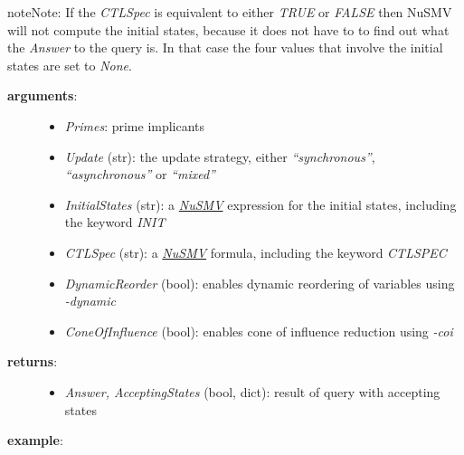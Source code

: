 \documentclass[letterpaper,10pt,english]{sphinxmanual}
\begin{document}
\begin{fulllineitems}
\begin{notice}{note}{Note:}
If the \emph{CTLSpec} is equivalent to either \emph{TRUE} or \emph{FALSE} then NuSMV will not compute the initial states,
because it does not have to to find out what the \emph{Answer} to the query is.
In that case the four values that involve the initial states are set to \emph{None}.
\end{notice}
\begin{description}
\item[{\textbf{arguments}:}] \leavevmode\begin{itemize}
\item {} 
\emph{Primes}: prime implicants

\item {} 
\emph{Update} (str): the update strategy, either \emph{``synchronous''}, \emph{``asynchronous''} or \emph{``mixed''}

\item {} 
\emph{InitialStates} (str): a {\hyperref[Installation:installation-nusmv]{\emph{NuSMV}}} expression for the initial states, including the keyword \emph{INIT}

\item {} 
\emph{CTLSpec} (str): a {\hyperref[Installation:installation-nusmv]{\emph{NuSMV}}} formula, including the keyword \emph{CTLSPEC}

\item {} 
\emph{DynamicReorder} (bool): enables dynamic reordering of variables using \emph{-dynamic}

\item {} 
\emph{ConeOfInfluence} (bool): enables cone of influence reduction using \emph{-coi}

\end{itemize}

\item[{\textbf{returns}:}] \leavevmode\begin{itemize}
\item {} 
\emph{Answer, AcceptingStates} (bool, dict): result of query with accepting states

\end{itemize}

\end{description}

\textbf{example}:


\end{fulllineitems}
\end{document}

